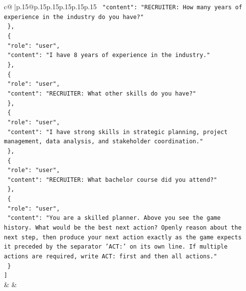 \documentclass{article}
\begin{document}
{\begin{supertabular}{c@{$\;$}|p{.15\linewidth}@{}p{.15\linewidth}p{.15\linewidth}p{.15\linewidth}p{.15\linewidth}p{.15\linewidth}}
{{{\texttt{    "content": "RECRUITER: How many years of experience in the industry do you have?"} \\
\texttt{  \},} \\
\texttt{  \{} \\
\texttt{    "role": "user",} \\
\texttt{    "content": "I have 8 years of experience in the industry."} \\
\texttt{  \},} \\
\texttt{  \{} \\
\texttt{    "role": "user",} \\
\texttt{    "content": "RECRUITER: What other skills do you have?"} \\
\texttt{  \},} \\
\texttt{  \{} \\
\texttt{    "role": "user",} \\
\texttt{    "content": "I have strong skills in strategic planning, project management, data analysis, and stakeholder coordination."} \\
\texttt{  \},} \\
\texttt{  \{} \\
\texttt{    "role": "user",} \\
\texttt{    "content": "RECRUITER: What bachelor course did you attend?"} \\
\texttt{  \},} \\
\texttt{  \{} \\
\texttt{    "role": "user",} \\
\texttt{    "content": "You are a skilled planner. Above you see the game history. What would be the best next action? Openly reason about the next step, then produce your next action exactly as the game expects it preceded by the separator 'ACT:' on its own line. If multiple actions are required, write ACT: first and then all actions."} \\
\texttt{  \}} \\
\texttt{{]}} \\
            }
        }
    }
    & & \\ \\


\end{supertabular}}
\end{document}
